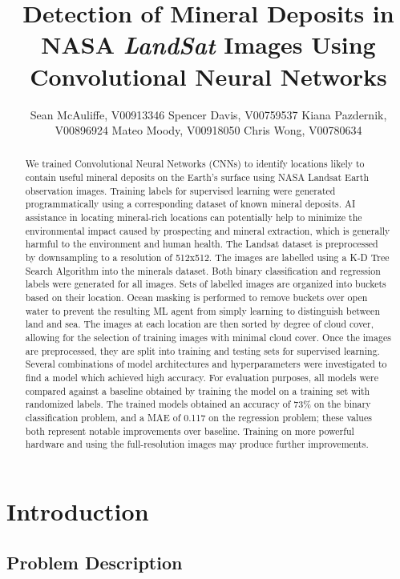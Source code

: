 \documentclass[10pt]{article}
\title{Detection of Mineral Deposits in NASA \emph{LandSat}
        Images Using Convolutional Neural Networks}
\author{
  Sean McAuliffe, V00913346
  \And
  Spencer Davis, V00759537 
  \And
  Kiana Pazdernik, V00896924 
  \And
  Mateo Moody, V00918050 
  \And
  Chris Wong, V00780634 
}
\begin{document}
\maketitle

\begin{abstract}
  We trained Convolutional Neural Networks (CNNs) to identify locations likely
  to contain useful mineral deposits on the Earth's surface using NASA Landsat
  Earth observation images. Training labels for supervised learning were generated
  programmatically using a corresponding dataset of known mineral deposits. AI
  assistance in locating mineral-rich locations can potentially help to minimize
  the environmental impact caused by prospecting and mineral extraction, which
  is generally harmful to the environment and human health. The Landsat
  dataset is preprocessed by downsampling to a resolution of 512x512. The images
  are labelled using a K-D Tree Search Algorithm into the minerals dataset. Both
  binary classification and regression labels were generated for all images.
  Sets of labelled images are organized into buckets based on their location.
  Ocean masking is performed to remove buckets over open water to prevent the
  resulting ML agent from simply learning to distinguish between land and sea.
  The images at each location are then sorted by degree of cloud cover, allowing
  for the selection of training images with minimal cloud cover. Once the images
  are preprocessed, they are split into training and testing sets for supervised
  learning. Several combinations of model architectures and hyperparameters
  were investigated to find a model which achieved high accuracy. For evaluation
  purposes, all models were compared against a baseline obtained by training the
  model on a training set with randomized labels. The trained models obtained an
  accuracy of 73\% on the binary classification problem, and a MAE of 0.117 on
  the regression problem; these values both represent notable improvements over
  baseline. Training on more powerful hardware and using the full-resolution
  images may produce further improvements.
\end{abstract}

\section{Introduction}

\subsection{Problem Description}
\end{document}
